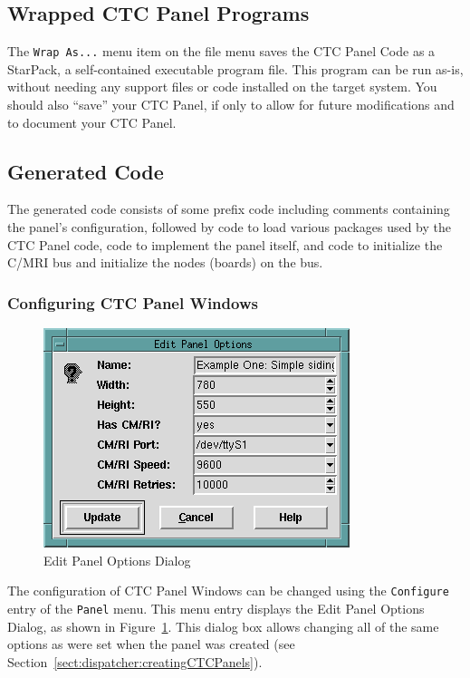 \subsection{Wrapped CTC Panel Programs}
\label{sect:dispatcher:wrapas}

The \verb=Wrap As...= menu item on the file menu saves the CTC Panel
Code as a StarPack, a self-contained executable program file.  This
program can be run as-is, without needing any support files or code
installed on the target system.  You should also ``save'' your CTC
Panel, if only to allow for future modifications and to document your
CTC Panel.

\subsection{Generated Code}

The generated code consists of some prefix code including comments
containing the panel's configuration, followed by code to load various
packages used by the CTC Panel code, code to implement the panel
itself, and code to initialize the C/MRI bus and initialize the nodes
(boards) on the bus.

\subsubsection{Configuring CTC Panel Windows}

\begin{figure}[hbpt]
\begin{centering}
\includegraphics{DISPEditPanelOptions.png}
\caption{Edit Panel Options Dialog}
\label{fig:dispatcher:editPanelOptsDialog}
\end{centering}
\end{figure}
The configuration of CTC Panel Windows can be changed using the
\verb=Configure= entry of the \verb=Panel= menu.  This menu entry
displays the Edit Panel Options Dialog, as shown in
Figure~\ref{fig:dispatcher:editPanelOptsDialog}. This dialog box allows
changing all of the same options as were set when the panel was created
(see Section~\ref{sect:dispatcher:creatingCTCPanels}).

